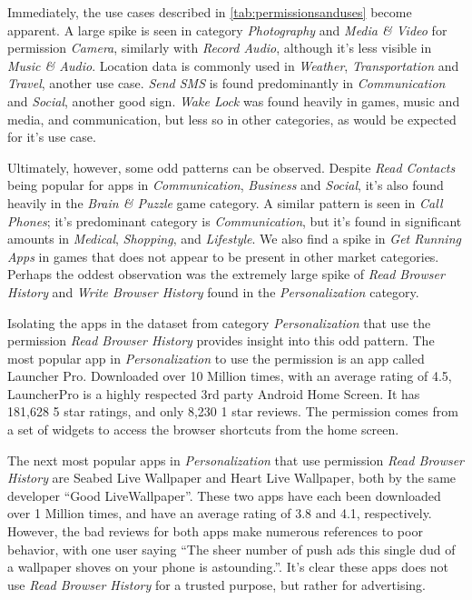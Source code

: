 Immediately, the use cases described in \ref{tab:permissionsanduses} become apparent. A large spike is seen in category \textit{Photography} and \textit{Media \& Video} for permission \textit{Camera}, similarly with \textit{Record Audio}, although it's less visible in \textit{Music \& Audio}. Location data is commonly used in \textit{Weather}, \textit{Transportation} and \textit{Travel}, another use case. \textit{Send SMS} is found predominantly in \textit{Communication} and \textit{Social}, another good sign. \textit{Wake Lock} was found heavily in games, music and media, and communication, but less so in other categories, as would be expected for it's use case.

Ultimately, however, some odd patterns can be observed. Despite \textit{Read Contacts} being popular for apps in \textit{Communication}, \textit{Business} and \textit{Social}, it's also found heavily in the \textit{Brain \& Puzzle} game category. A similar pattern is seen in \textit{Call Phones}; it's predominant category is \textit{Communication}, but it's found in significant amounts in \textit{Medical}, \textit{Shopping}, and \textit{Lifestyle}. We also find a spike in \textit{Get Running Apps} in games that does not appear to be present in other market categories. Perhaps the oddest observation was the extremely large spike of \textit{Read Browser History} and \textit{Write Browser History} found in the \textit{Personalization} category.

Isolating the apps in the dataset from category \textit{Personalization} that use the permission \textit{Read Browser History} provides insight into this odd pattern. The most popular app in \textit{Personalization} to use the permission is an app called Launcher Pro\citep{launcherpro}. Downloaded over 10 Million times, with an average rating of 4.5, LauncherPro is a highly respected 3rd party Android Home Screen. It has 181,628 5 star ratings, and only 8,230 1 star reviews. The permission comes from a set of widgets to access the browser shortcuts from the home screen.

The next most popular apps in \textit{Personalization} that use permission \textit{Read Browser History} are Seabed Live Wallpaper\citep{seabedlivewallpaper} and Heart Live Wallpaper\citep{heartlivewallpaper}, both by the same developer ``Good LiveWallpaper''\citep{goodlivewallpaper}. These two apps have each been downloaded over 1 Million times, and have an average rating of 3.8 and 4.1, respectively. However, the bad reviews for both apps make numerous references to poor behavior, with one user saying ``The sheer number of push ads this single dud of a wallpaper shoves on your phone is astounding.''\citep{seabedlivewallpaper}. It's clear these apps does not use \textit{Read Browser History} for a trusted purpose, but rather for advertising.

